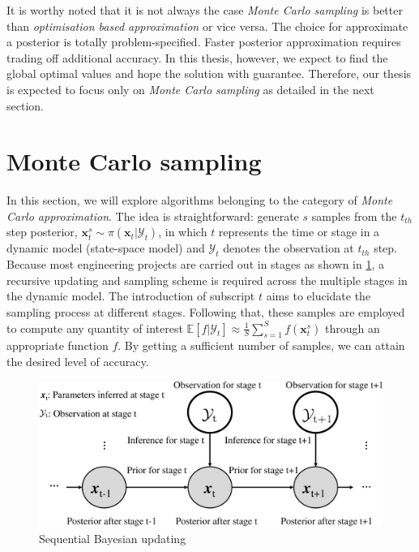 It is worthy noted that it is not always the case \textit{Monte Carlo sampling} is better than \textit{optimisation based approximation} or vice versa. The choice for approximate a posterior is totally problem-specified. Faster posterior approximation requires trading off additional accuracy. In this thesis, however, we expect to find the global optimal values and hope the solution with guarantee. Therefore, our thesis is expected to focus only on \textit{Monte Carlo sampling} as detailed in the next section.

\section{Monte Carlo sampling}
In this section, we will explore algorithms belonging to the category of \textit{Monte Carlo approximation}. The idea is straightforward: generate $s$ samples from the $t_{th}$ step posterior, $\boldsymbol{x}_{t}^{s} \sim  \pi(\boldsymbol{x}_{t}|\mathcal{Y}_{t})$, in which $t$ represents the time or stage in a dynamic model (state-space model) and $\mathcal{Y}_{t}$ denotes the observation at $t_{th}$ step. Because most engineering projects are carried out in stages as shown in \cref{fig: Sequential Bayesian}, a recursive updating and sampling scheme is required across the multiple stages in the dynamic model. The introduction of subscript $t$ aims to elucidate the sampling process at different stages. Following that, these samples are employed to compute any quantity of interest $\mathbb{E}[ f|\mathcal{Y}_{t}] \approx \frac{1}{S} \sum_{s=1}^{S}f(\boldsymbol{x}_{t}^{s})$ through an appropriate function $f$. By getting a sufficient number of samples, we can attain the desired level of accuracy.
\begin{figure}[htbp]
    \centering
    \includegraphics[width = 140mm]{Figures/figures-Sequential_Bayesian.pdf}
    \caption{Sequential Bayesian updating}
    \label{fig: Sequential Bayesian}
\end{figure}
